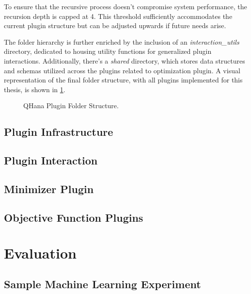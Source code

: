 \documentclass[
  a4paper,  %
  twoside,  %
  bibliography=totoc,
  headsepline,
  cleardoublepage=empty,
  parskip=half,
  draft=false
]{scrbook}
\begin{document}
To ensure that the recursive process doesn’t compromise system performance, the recursion depth is capped at 4.
This threshold sufficiently accommodates the current plugin structure but can be adjusted upwards if future needs arise.

The folder hierarchy is further enriched by the inclusion of an \textit{interaction\_utils} directory, dedicated to housing utility functions for generalized plugin interactions.
Additionally, there's a \textit{shared} directory, which stores data structures and schemas utilized across the plugins related to optimization plugin.
A visual representation of the final folder structure, with all plugins implemented for this thesis, is shown in \cref{fig:folderStructure}.


\begin{figure}[h!]
  \caption{QHana Plugin Folder Structure.}
  \label{fig:folderStructure}
\end{figure}


\section{Plugin Infrastructure}
\label{sec:pluginInfrastructure}
\section{Plugin Interaction}
\label{sec:pluginInteraction}
\section{Minimizer Plugin}
\label{sec:minimizerPlugin}
\section{Objective Function Plugins}
\label{sec:objectiveFunctionPlugins}


\chapter{Evaluation}
\label{chap:evaluation}
\section{Sample Machine Learning Experiment}
\label{sec:sampleMachineLearningExperiment}
\end{document}
